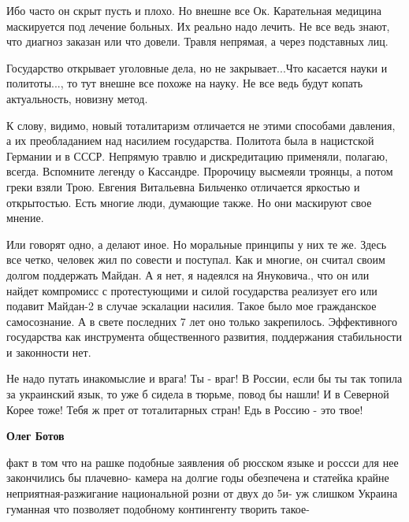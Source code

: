 \begin{itemize}
Ибо часто он скрыт пусть и плохо. Но внешне все Ок. Карательная медицина
маскируется под лечение больных. Их реально надо лечить. Не все ведь знают, что
диагноз заказан или что довели. Травля непрямая, а через подставных лиц.

Государство открывает уголовные дела, но не закрывает...Что касается науки и
политоты..., то тут внешне все похоже на науку. Не все ведь будут копать
актуальность, новизну метод. 

К слову, видимо, новый тоталитаризм отличается не
этими способами давления, а их преобладанием над насилием государства. Политота
была в нацистской Германии и в СССР. Непрямую травлю и дискредитацию применяли,
полагаю, всегда. Вспомните легенду о Кассандре. Пророчицу высмеяли троянцы, а
потом греки взяли Трою. Евгения Витальевна Бильченко отличается яркостью и
открытостью. Есть многие люди, думающие также. Но они маскируют свое мнение.

Или говорят одно, а делают иное. Но моральные принципы у них те же. Здесь все
четко, человек жил по совести и поступал. Как и многие, он считал своим долгом
поддержать Майдан. А я нет, я надеялся на Януковича., что он или найдет
компромисс с протестующими и силой государства реализует его или подавит
Майдан-2 в случае эскалации насилия. Такое было мое гражданское самосознание. А
в свете последних 7 лет оно только закрепилось. Эффективного государства как
инструмента общественного развития, поддержания стабильности и законности нет.


 

Не надо путать инакомыслие и врага! Ты - враг! В России, если бы ты так топила
за украинский язык, то уже б сидела в тюрьме, повод бы нашли! И в Северной
Корее тоже! Тебя ж прет от тоталитарных стран! Едь в Россию - это твое!

\begin{itemize}
 
\textbf{Олег Ботов} 

факт в том что на рашке подобные заявления об рюсском языке и россси для нее
закончились бы плачевно- камера на долгие годы обезпечена и статейка крайне
неприятная-разжигание национальной розни от двух до 5и- уж слишком Украина
гуманная что позволяет подобному контингенту творить такое-



\end{itemize}
\end{itemize}
